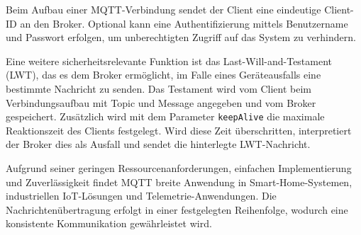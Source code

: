 \documentclass[12pt, letterpaper]{article}
\begin{document}
  \par Beim Aufbau einer MQTT-Verbindung sendet der Client eine eindeutige Client-ID an den Broker. Optional kann eine Authentifizierung mittels Benutzername und Passwort erfolgen, um unberechtigten Zugriff auf das System zu verhindern.
  \par Eine weitere sicherheitsrelevante Funktion ist das Last-Will-and-Testament (LWT), das es dem Broker ermöglicht, im Falle eines Geräteausfalls eine bestimmte Nachricht zu senden. Das Testament wird vom Client beim Verbindungsaufbau mit Topic und Message angegeben und vom Broker gespeichert. Zusätzlich wird mit dem Parameter \texttt{keepAlive} die maximale Reaktionszeit des Clients festgelegt. Wird diese Zeit überschritten, interpretiert der Broker dies als Ausfall und sendet die hinterlegte LWT-Nachricht. 
  \par Aufgrund seiner geringen Ressourcenanforderungen, einfachen Implementierung und Zuverlässigkeit findet MQTT breite Anwendung in Smart-Home-Systemen, industriellen IoT-Lösungen und Telemetrie-Anwendungen. Die Nachrichtenübertragung erfolgt in einer festgelegten Reihenfolge, wodurch eine konsistente Kommunikation gewährleistet wird.
\end{document}
